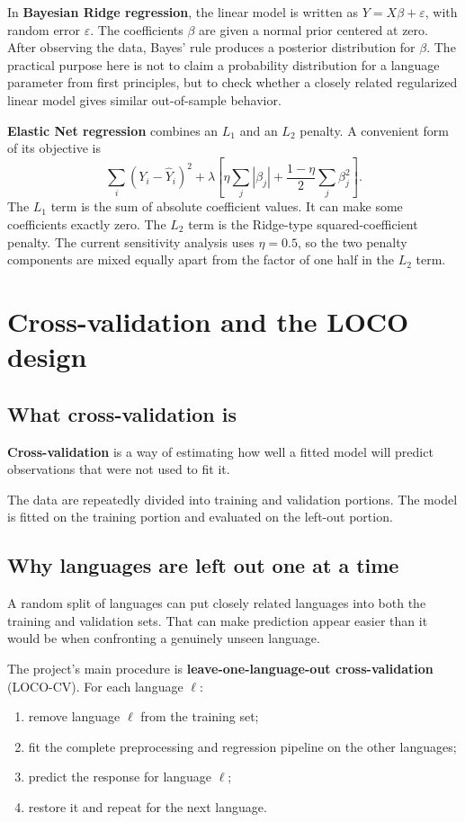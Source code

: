 \documentclass[11pt]{article}
\begin{document}
In \textbf{Bayesian Ridge regression}, the linear model is written as $Y=X\beta+\varepsilon$, with random error $\varepsilon$. The coefficients $\beta$ are given a normal prior centered at zero. After observing the data, Bayes' rule produces a posterior distribution for $\beta$. The practical purpose here is not to claim a probability distribution for a language parameter from first principles, but to check whether a closely related regularized linear model gives similar out-of-sample behavior.

\textbf{Elastic Net regression} combines an $L_1$ and an $L_2$ penalty. A convenient form of its objective is
\[
\sum_i(Y_i-\hat Y_i)^2
+\lambda\left[\eta\sum_j|\beta_j|+\frac{1-\eta}{2}\sum_j\beta_j^2\right].
\]
The $L_1$ term is the sum of absolute coefficient values. It can make some coefficients exactly zero. The $L_2$ term is the Ridge-type squared-coefficient penalty. The current sensitivity analysis uses $\eta=0.5$, so the two penalty components are mixed equally apart from the factor of one half in the $L_2$ term.

\newpage
\section{Cross-validation and the LOCO design}

\subsection{What cross-validation is}
\textbf{Cross-validation} is a way of estimating how well a fitted model will predict observations that were not used to fit it.

The data are repeatedly divided into training and validation portions. The model is fitted on the training portion and evaluated on the left-out portion.

\subsection{Why languages are left out one at a time}
A random split of languages can put closely related languages into both the training and validation sets. That can make prediction appear easier than it would be when confronting a genuinely unseen language.

The project's main procedure is \textbf{leave-one-language-out cross-validation} (LOCO-CV). For each language $\ell$:
\begin{enumerate}
\item remove language $\ell$ from the training set;
\item fit the complete preprocessing and regression pipeline on the other languages;
\item predict the response for language $\ell$;
\item restore it and repeat for the next language.
\end{enumerate}
\end{document}
